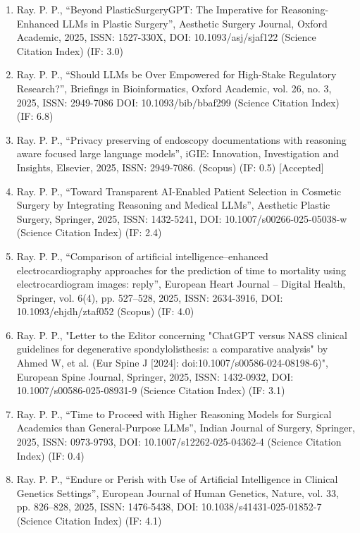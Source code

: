 \documentclass[11pt,a4paper]{moderncv}
\begin{document}
\begin{adjustwidth}{6em}{0pt}
\begin{enumerate}
		\item Ray. P. P., “Beyond PlasticSurgeryGPT: The Imperative for Reasoning-Enhanced LLMs in Plastic Surgery”, Aesthetic Surgery Journal, Oxford Academic, 2025, ISSN: 1527-330X, DOI: 10.1093/asj/sjaf122 (Science Citation Index) (IF: 3.0)
		
		\item Ray. P. P., “Should LLMs be Over Empowered for High-Stake Regulatory Research?”, Briefings in Bioinformatics, Oxford Academic, vol. 26, no. 3, 2025, ISSN: 2949-7086 DOI: 10.1093/bib/bbaf299 (Science Citation Index) (IF: 6.8)
		
		\item Ray. P. P., “Privacy preserving of endoscopy documentations with reasoning aware focused large language models”, iGIE: Innovation, Investigation and Insights, Elsevier, 2025, ISSN: 2949-7086. (Scopus) (IF: 0.5) [Accepted]
		
		\item Ray. P. P., “Toward Transparent AI-Enabled Patient Selection in Cosmetic Surgery by Integrating Reasoning and Medical LLMs”, Aesthetic Plastic Surgery, Springer, 2025, ISSN: 1432-5241, DOI: 10.1007/s00266-025-05038-w (Science Citation Index) (IF: 2.4) 
		
		\item Ray. P. P., “Comparison of artificial intelligence–enhanced electrocardiography approaches for the prediction of time to mortality using electrocardiogram images: reply”, European Heart Journal – Digital Health, Springer, vol. 6(4), pp. 527–528, 2025, ISSN: 2634-3916, DOI: 10.1093/ehjdh/ztaf052 (Scopus) (IF: 4.0)
		
		\item Ray. P. P.,  "Letter to the Editor concerning "ChatGPT versus NASS clinical guidelines for degenerative spondylolisthesis: a comparative analysis" by Ahmed W, et al. (Eur Spine J [2024]: doi:10.1007/s00586-024-08198-6)", European Spine Journal, Springer, 2025, ISSN: 1432-0932, DOI: 10.1007/s00586-025-08931-9 (Science Citation Index) (IF: 3.1)
		\item Ray. P. P., “Time to Proceed with Higher Reasoning Models for Surgical Academics than General-Purpose LLMs”, Indian Journal of Surgery, Springer, 2025, ISSN: 0973-9793, DOI: 10.1007/s12262-025-04362-4 (Science Citation Index) (IF: 0.4)
		
		\item Ray. P. P., “Endure or Perish with Use of Artificial Intelligence in Clinical Genetics Settings”, European Journal of Human Genetics, Nature, vol. 33, pp. 826–828, 2025, ISSN: 1476-5438, DOI: 10.1038/s41431-025-01852-7 (Science Citation Index) (IF: 4.1)
		

\end{enumerate}
\end{adjustwidth}
\end{document}
